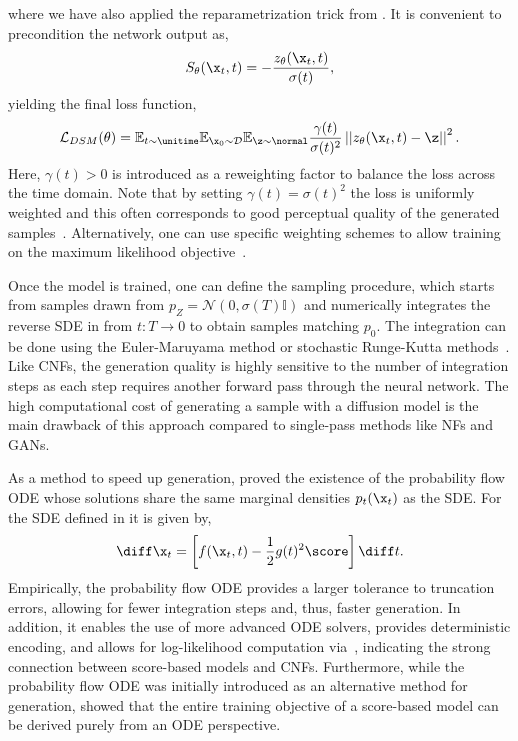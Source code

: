 where we have also applied the reparametrization trick from .
It is convenient to precondition the network output as,
\begin{equation}
    \label{eq:precondition}
    S_\theta(\x_t, t) = - \frac{z_\theta(\x_t, t)}{\sigma(t)},
\end{equation}
yielding the final loss function,
\begin{equation}
    \label{eq:noise_loss}
    \mathcal{L}_{DSM}(\theta) =
    \mathbb{E}_{t \sim \unitime}
    \mathbb{E}_{\x_0 \sim \mathcal{D}}
    \mathbb{E}_{\z \sim \normal}
    \frac{\gamma(t)}{\sigma(t)^2}
    \left|\left|z_\theta(\x_t, t) - \z\right|\right|^2.
\end{equation}
Here, $\gamma(t) > 0$ is introduced as a reweighting factor to balance the loss across the time domain.
Note that by setting $\gamma(t) = \sigma(t)^2$ the loss is uniformly weighted and this often corresponds to good perceptual quality of the generated samples~\cite{VariationalPerspectiveDiffusionBased, VariationalDiffusionModels, ImprovedDenoisingDiffusion}.
Alternatively, one can use specific weighting schemes to allow training on the maximum likelihood objective~\cite{UnderstandingDiffusionModels}.

Once the model is trained, one can define the sampling procedure, which starts from samples drawn from $p_Z=\mathcal{N}(0, \sigma(T) \mathbb{I})$ and numerically integrates the reverse SDE in  from $t: T \rightarrow 0$ to obtain samples matching $p_0$.
The integration can be done using the Euler-Maruyama method or stochastic Runge-Kutta methods~\cite{NumericalSolutionStochastic}.
Like CNFs, the generation quality is highly sensitive to the number of integration steps as each step requires another forward pass through the neural network.
The high computational cost of generating a sample with a diffusion model is the main drawback of this approach compared to single-pass methods like NFs and GANs.

As a method to speed up generation, \textcite{ScoreBasedGenerativeModeling} proved the existence of the probability flow ODE whose solutions share the same marginal densities $p_t(\x_t)$ as the SDE.
For the SDE defined in  it is given by,
\begin{equation}
    \label{eq:probability_flow}
    \diff \x_t = \left[f(\x_t, t) - \frac{1}{2} g(t)^2 \score\right] \diff t.
\end{equation}
Empirically, the probability flow ODE provides a larger tolerance to truncation errors, allowing for fewer integration steps and, thus, faster generation.
In addition, it enables the use of more advanced ODE solvers, provides deterministic encoding, and allows for log-likelihood computation via~, indicating the strong connection between score-based models and CNFs.
Furthermore, while the probability flow ODE was initially introduced as an alternative method for generation, \textcite{ElucidatingDesignSpace} showed that the entire training objective of a score-based model can be derived purely from an ODE perspective.

